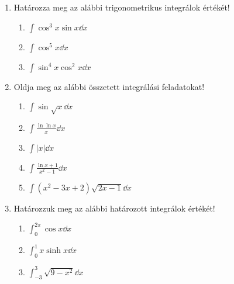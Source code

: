 \documentclass[a4paper, 12pt]{scrartcl}
\begin{document}
\begin{enumerate}
  \item Határozza meg az alábbi trigonometrikus integrálok értékét!
        \begin{enumerate}
          \item $\displaystyle
                  \int \cos^3 x \sin x \dd x
                $

          \item $\displaystyle
                  \int \cos^5 x \dd x
                $

          \item $\displaystyle
                  \int \sin^4 x \cos^2 x \dd x
                $
        \end{enumerate}

  \item Oldja meg az alábbi összetett integrálási feladatokat!
        \begin{enumerate}
          \item $\displaystyle
                  \int \sin \sqrt x \dd x
                $

          \item $\displaystyle
                  \int \frac{\ln \ln x}{x} \dd x
                $

          \item $\displaystyle
                  \int |x| \dd x
                $

          \item $\displaystyle
                  \int \frac{\ln x + 1}{x^x - 1} \dd x
                $

          \item $\displaystyle
                  \int (x^2 - 3x + 2) \sqrt{2x - 1} \dd x
                $
        \end{enumerate}

  \item Határozzuk meg az alábbi határozott integrálok értékét!
        \begin{enumerate}
          \item $\displaystyle
                  \int_0^{2\pi} \cos x \dd x
                $

          \item $\displaystyle
                  \int_0^1 x \sinh x \dd x
                $

          \item $\displaystyle
                  \int_{-3}^3 \sqrt{9 - x^2} \dd x
                $
        \end{enumerate}


\end{enumerate}
\end{document}
